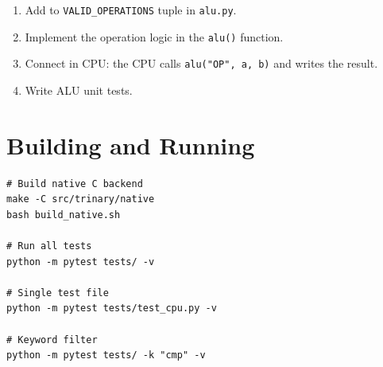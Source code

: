 \documentclass[10pt,a4paper,twoside]{book}
\begin{document}
\begin{enumerate}
    \item Add to \texttt{VALID\_OPERATIONS} tuple in \texttt{alu.py}.
    \item Implement the operation logic in the \texttt{alu()} function.
    \item Connect in CPU: the CPU calls \texttt{alu("OP", a, b)} and writes the result.
    \item Write ALU unit tests.
\end{enumerate}

\section{Building and Running}

\begin{verbatim}
# Build native C backend
make -C src/trinary/native
bash build_native.sh

# Run all tests
python -m pytest tests/ -v

# Single test file
python -m pytest tests/test_cpu.py -v

# Keyword filter
python -m pytest tests/ -k "cmp" -v
\end{verbatim}

\end{document}
